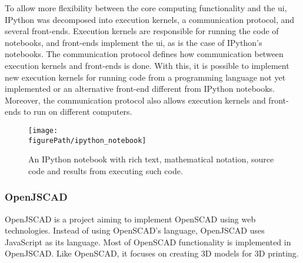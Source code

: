 
To allow more flexibility between the core computing functionality and the \gls{ui}, IPython was decomposed into execution kernels, a communication protocol, and several front-ends.
Execution kernels are responsible for running the code of notebooks, and front-ends implement the \gls{ui}, as is the case of IPython's notebooks.
The communication protocol defines how communication between execution kernels and front-ends is done.
With this, it is possible to implement new execution kernels for running code from a programming language not yet implemented or an alternative front-end different from IPython notebooks.
Moreover, the communication protocol also allows execution kernels and front-ends to run on different computers\cite{PER-GRA:2007}.


\begin{figure}
	\centering
	\texttt{[image: \\figurePath/ipython\_notebook]}
	\caption{An IPython notebook with rich text, mathematical notation, source code and results from executing such code.}
	\label{fig:ipython:notebook}
\end{figure}


\subsubsection{OpenJSCAD}
OpenJSCAD\cite{openjscad2015site} is a project aiming to implement OpenSCAD\cite{kintel2011openscad} using web technologies.
Instead of using OpenSCAD's language, OpenJSCAD uses JavaScript as its language.
Most of OpenSCAD functionality is implemented in OpenJSCAD.
Like OpenSCAD, it focuses on creating 3D models for 3D printing.


